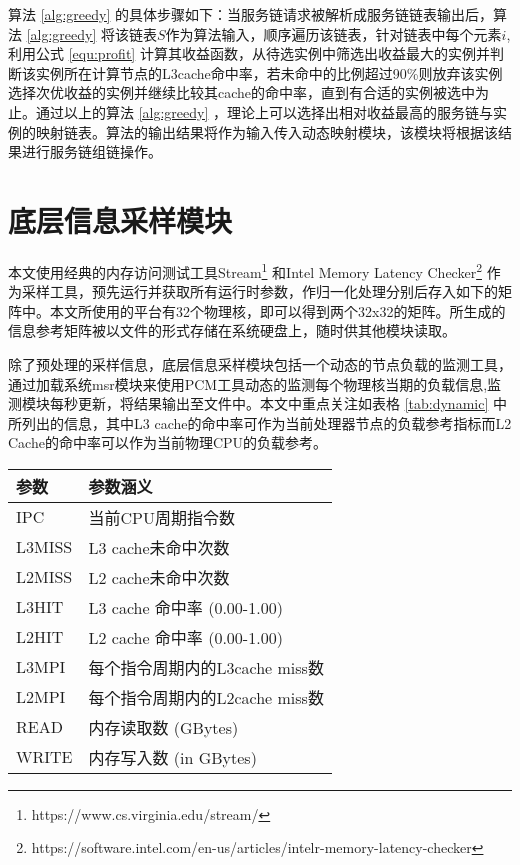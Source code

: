 算法 \ref{alg:greedy} 的具体步骤如下：当服务链请求被解析成服务链链表输出后，算法 \ref{alg:greedy} 将该链表$S$作为算法输入，顺序遍历该链表，针对链表中每个元素$i$,利用公式 \ref{equ:profit} 计算其收益函数，从待选实例中筛选出收益最大的实例并判断该实例所在计算节点的L3cache命中率，若未命中的比例超过90\%则放弃该实例选择次优收益的实例并继续比较其cache的命中率，直到有合适的实例被选中为止。通过以上的算法 \ref{alg:greedy} ，理论上可以选择出相对收益最高的服务链与实例的映射链表。算法的输出结果将作为输入传入动态映射模块，该模块将根据该结果进行服务链组链操作。


\section{底层信息采样模块}
本文使用经典的内存访问测试工具Stream\footnote{https://www.cs.virginia.edu/stream/} 和Intel Memory Latency Checker\footnote{https://software.intel.com/en-us/articles/intelr-memory-latency-checker} 作为采样工具，预先运行并获取所有运行时参数，作归一化处理分别后存入如下的矩阵中。本文所使用的平台有32个物理核，即可以得到两个32x32的矩阵。所生成的信息参考矩阵被以文件的形式存储在系统硬盘上，随时供其他模块读取。

除了预处理的采样信息，底层信息采样模块包括一个动态的节点负载的监测工具，通过加载系统msr模块来使用PCM工具动态的监测每个物理核当期的负载信息,监测模块每秒更新，将结果输出至文件中。本文中重点关注如表格 \ref{tab:dynamic} 中所列出的信息，其中L3 cache的命中率可作为当前处理器节点的负载参考指标而L2 Cache的命中率可以作为当前物理CPU的负载参考。

\begin{table}[!htb]
	\centering
	\begin{tabular}{ | l | p{6cm} |}\hline
\textbf{参数} &							 \textbf{参数涵义}  				\\ 	\hline
IPC   & 当前CPU周期指令数\\ \hline
L3MISS & L3 cache未命中次数\\ \hline
L2MISS & L2 cache未命中次数\\ \hline
L3HIT & L3 cache 命中率 (0.00-1.00)\\ \hline
L2HIT & L2 cache 命中率 (0.00-1.00)\\ \hline
L3MPI & 每个指令周期内的L3cache miss数\\ \hline
L2MPI & 每个指令周期内的L2cache miss数\\ \hline
READ  & 内存读取数 (GBytes)\\ \hline
WRITE & 内存写入数 (in GBytes)\\ \hline
	\end{tabular}
\end{table}


